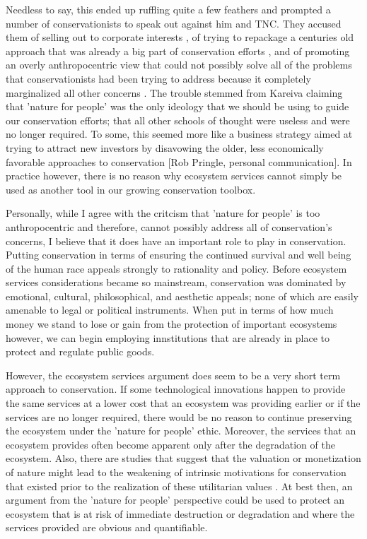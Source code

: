 \documentclass[rutwik_proposal.tex]{subfiles}
\begin{document}
Needless to say, this ended up ruffling quite a few feathers and prompted a number of conservationists to speak out against him and TNC. They accused them of selling out to corporate interests \cite{Soule14}, of trying to repackage a centuries old approach that was already a big part of conservation efforts \cite{Greenwald13, Doak14}, and of promoting an overly anthropocentric view that could not possibly solve all of the problems that conservationists had been trying to address because it completely marginalized all other concerns \cite{Doak14}. The trouble stemmed from Kareiva claiming that 'nature for people' was the only ideology that we should be using to guide our conservation efforts; that all other schools of thought were useless and were no longer required. To some, this seemed more like a business strategy aimed at trying to attract new investors by disavowing the older, less economically favorable approaches to conservation [Rob Pringle, personal communication]. In practice however, there is no reason why ecosystem services cannot simply be used as another tool in our growing conservation toolbox.

Personally, while I agree with the critcism that 'nature for people' is too anthropocentric and therefore, cannot possibly address all of conservation's concerns, I believe that it does have an important role to play in conservation. Putting conservation in terms of ensuring the continued survival and well being of the human race appeals strongly to rationality and policy. Before ecosystem services considerations became so mainstream, conservation was dominated by emotional, cultural, philosophical, and aesthetic appeals; none of which are easily amenable to legal or political instruments. When put in terms of how much money we stand to lose or gain from the protection of important ecosystems however, we can begin employing innstitutions that are already in place to protect and regulate public goods.

However, the ecosystem services argument does seem to be a very short term approach to conservation. If some technological innovations happen to provide the same services at a lower cost that an ecosystem was providing earlier or if the services are no longer required, there would be no reason to continue preserving the ecosystem under the 'nature for people' ethic. Moreover, the services that an ecosystem provides often become apparent only after the degradation of the ecosystem. Also, there are studies that suggest that the valuation or monetization of nature might lead to the weakening of intrinsic motivations for conservation that existed prior to the realization of these utilitarian values \cite{Agrawal15}. At best then, an argument from the 'nature for people' perspective could be used to protect an ecosystem that is at risk of immediate destruction or degradation and where the services provided are obvious and quantifiable.
\end{document}
